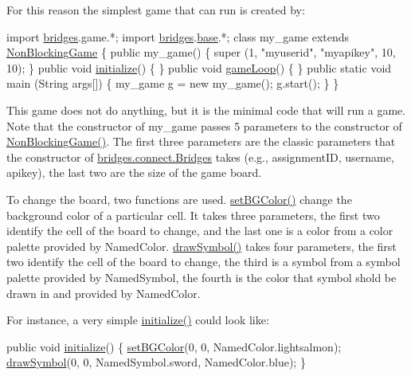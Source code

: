 For this reason the simplest game that can run is created by\+:


\begin{DoxyCode}
\textcolor{keyword}{import} \hyperlink{namespacebridges}{bridges}.game.*;
\textcolor{keyword}{import} \hyperlink{namespacebridges}{bridges}.\hyperlink{namespacebridges_1_1base}{base}.*;
\textcolor{keyword}{class }my\_game \textcolor{keyword}{extends} \hyperlink{classbridges_1_1games_1_1_non_blocking_game_ae85ea8dcc355372ba354f4e26323fb76}{NonBlockingGame} \{
  \textcolor{keyword}{public} my\_game() \{ super (1, \textcolor{stringliteral}{"myuserid"},  \textcolor{stringliteral}{"myapikey"}, 10, 10); \}
  \textcolor{keyword}{public} \textcolor{keywordtype}{void} \hyperlink{classbridges_1_1games_1_1_game_base_a973a52d5eee7c29b01d668fba3c61657}{initialize}()  \{ \}
  \textcolor{keyword}{public} \textcolor{keywordtype}{void} \hyperlink{classbridges_1_1games_1_1_game_base_a56d05ed744791cfc1c3792f39ff438f1}{gameLoop}()  \{ \}
  \textcolor{keyword}{public} \textcolor{keyword}{static} \textcolor{keywordtype}{void}  main (String args[]) \{
    my\_game g = \textcolor{keyword}{new} my\_game();
    g.start();
  \}
\}
\end{DoxyCode}


This game does not do anything, but it is the minimal code that will run a game. Note that the constructor of my\+\_\+game passes 5 parameters to the constructor of \hyperlink{classbridges_1_1games_1_1_non_blocking_game_ae85ea8dcc355372ba354f4e26323fb76}{Non\+Blocking\+Game()}. The first three parameters are the classic parameters that the constructor of \hyperlink{classbridges_1_1connect_1_1_bridges}{bridges.\+connect.\+Bridges} takes (e.\+g., assignment\+ID, username, apikey), the last two are the size of the game board.

To change the board, two functions are used. \hyperlink{classbridges_1_1games_1_1_game_base_ac9a231dd4425eb0f9dea2377653b23c4}{set\+B\+G\+Color()} change the background color of a particular cell. It takes three parameters, the first two identify the cell of the board to change, and the last one is a color from a color palette provided by Named\+Color. \hyperlink{classbridges_1_1games_1_1_game_base_a7dd4caecd0522dcf7fc275517fbc695d}{draw\+Symbol()} takes four parameters, the first two identify the cell of the board to change, the third is a symbol from a symbol palette provided by Named\+Symbol, the fourth is the color that symbol shold be drawn in and provided by Named\+Color.

For instance, a very simple \hyperlink{classbridges_1_1games_1_1_game_base_a973a52d5eee7c29b01d668fba3c61657}{initialize()} could look like\+: 
\begin{DoxyCode}
\textcolor{keyword}{public} \textcolor{keywordtype}{void} \hyperlink{classbridges_1_1games_1_1_game_base_a973a52d5eee7c29b01d668fba3c61657}{initialize}() \{
  \hyperlink{classbridges_1_1games_1_1_game_base_ac9a231dd4425eb0f9dea2377653b23c4}{setBGColor}(0, 0, NamedColor.lightsalmon);
  \hyperlink{classbridges_1_1games_1_1_game_base_a7dd4caecd0522dcf7fc275517fbc695d}{drawSymbol}(0, 0, NamedSymbol.sword, NamedColor.blue);
\}
\end{DoxyCode}


